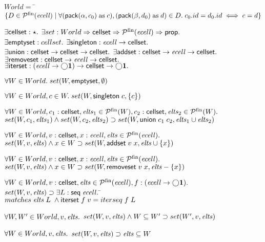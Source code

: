 \begin{figure}
\begin{specification}
\nextline
$World = $ \nextline
\qquad\=$\{D \in \mathcal{P}^{\mathrm{fin}}(\mathit{ecell})\;|\;\forall (\mathsf{pack}({\alpha}, {c_0}) \; \mathrm{as}\; c),(\mathsf{pack}({\beta}, {d_0}) \;\mathrm{as}\; d) \in D.\;c_0.id = d_0.id \iff c = d\}$\nextline[1em]

$\exists \mathsf{cellset} : \star.$ \nextline
$\exists set : World \Rightarrow \mathsf{cellset} \Rightarrow \mathcal{P}^{\mathrm{fin}}(\mathit{ecell}) \Rightarrow \mathsf{prop}.$ \nextline
$\exists \mathsf{emptyset}    : cellset.$ \nextline
$\exists \mathsf{singleton}   : \mathit{ecell} \to \mathsf{cellset}.$ \nextline
$\exists \mathsf{union}      : \mathsf{cellset} \to \mathsf{cellset} \to \mathsf{cellset}.$ \nextline
$\exists \mathsf{addset}      : \mathsf{cellset} \to \mathit{ecell} \to \mathsf{cellset}.$ \nextline
$\exists \mathsf{removeset}   : \mathsf{cellset} \to \mathit{ecell} \to \mathsf{cellset}.$ \nextline
$\exists \mathsf{iterset}     : (\mathit{ecell} \to \bigcirc{\mathbf{1}}) \to \mathsf{cellset} \to \bigcirc{\mathbf{1}}.$\nextline[1em]

$\forall W \in World.\; set(W, \mathsf{emptyset}, \emptyset)$ \nextline[1em]

$\forall W \in World, c \in W.\; set(W, \mathsf{singleton}\;c, \{{c}\})$ \nextline[1em]

$\forall W \in World, c_1 : \mathsf{cellset}, \mathit{elts}_1 \in \mathcal{P}^{\mathrm{fin}}(W), c_2 : \mathsf{cellset}, \mathit{elts}_2 \in \mathcal{P}^{\mathrm{fin}}(W).$ \nextline
\>$set(W, c_1, \mathit{elts}_1) \land set(W, c_2, \mathit{elts}_2) \supset set(W, \mathsf{union}\;c_1\;c_2, \mathit{elts}_1 \cup \mathit{elts}_2)$ \nextline[1em]


$\forall W \in World, v : \mathsf{cellset}, x : \mathit{ecell}, \mathit{elts} \in \mathcal{P}^{\mathrm{fin}}(\mathit{ecell}).$ \nextline 
\> $set(W, v, \mathit{elts}) \land x \in W \supset set(W, \mathsf{addset}\;v\;x, \mathit{elts} \cup \{{x}\})$ \nextline[1em]


$\forall W \in World, v : \mathsf{cellset}, x : \mathit{ecell}, \mathit{elts} \in \mathcal{P}^{\mathrm{fin}}(\mathit{ecell}).$ \nextline 
\> $set(W, v, \mathit{elts}) \land x \in W \supset set(W, \mathsf{removeset}\;v\;x, \mathit{elts} - \{{x}\})$ \nextline[1em]


$\forall W \in World, v : \mathsf{cellset}, \mathit{elts} \in \mathcal{P}^{\mathrm{fin}}(\mathit{ecell}), 
         f : (\mathit{ecell} \to \bigcirc{\mathbf{1}}).$ \nextline 
\> $set(W, v, \mathit{elts}) \supset \exists L : \mathsf{seq}\;{\mathit{ecell}}.\;$\=$matches\;\mathit{elts}\;L\; \land \mathsf{iterset}\;f\;v = iterseq\;f\;L$ \nextline[1em]


$\forall W, W' \in World, v, \mathit{elts}.$ \nextline
\>$set(W,v,\mathit{elts}) \land W \subseteq W' \supset set(W',v, \mathit{elts})$\nextline[1em]

$\forall W \in World, v, \mathit{elts}.$ \nextline
\>$set(W, v, \mathit{elts}) \supset \mathit{elts} \subseteq W$ \nextline[1em]


\end{specification}
\end{figure}
